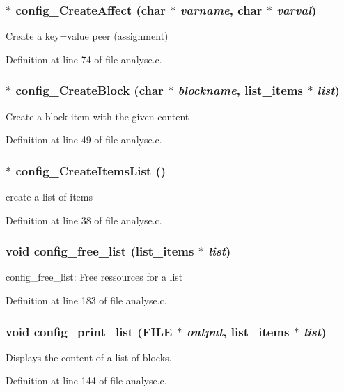 \subsubsection[{config\_\-CreateAffect}]{$\ast$ config\_\-CreateAffect (char $\ast$ {\em varname}, \/  char $\ast$ {\em varval})}\label{analyse_8c_a19694ceaab9125cba46213b5f0857676}
Create a key=value peer (assignment) 

Definition at line 74 of file analyse.c.
\subsubsection[{config\_\-CreateBlock}]{$\ast$ config\_\-CreateBlock (char $\ast$ {\em blockname}, \/  {\bf list\_\-items} $\ast$ {\em list})}\label{analyse_8c_abe9e49a5e342b113519db7bcb9ad8ee3}
Create a block item with the given content 

Definition at line 49 of file analyse.c.
\subsubsection[{config\_\-CreateItemsList}]{$\ast$ config\_\-CreateItemsList ()}\label{analyse_8c_ab9e49c47a113c09943b6afebde940857}
create a list of items 

Definition at line 38 of file analyse.c.
\subsubsection[{config\_\-free\_\-list}]{\setlength{\rightskip}{0pt plus 5cm}void config\_\-free\_\-list ({\bf list\_\-items} $\ast$ {\em list})}\label{analyse_8c_adc8ddb7f244c0bb2aeb9af15ebd3545c}
config\_\-free\_\-list: Free ressources for a list 

Definition at line 183 of file analyse.c.
\subsubsection[{config\_\-print\_\-list}]{\setlength{\rightskip}{0pt plus 5cm}void config\_\-print\_\-list (FILE $\ast$ {\em output}, \/  {\bf list\_\-items} $\ast$ {\em list})}\label{analyse_8c_a11266361714a3c55a0d585dd118aaec5}
Displays the content of a list of blocks. 

Definition at line 144 of file analyse.c.